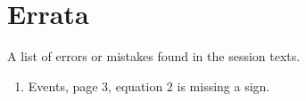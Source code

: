 


\maketitle
\clearpage

\section{Errata}

A list of errors or mistakes found in the session texts.

\begin{enumerate}
\item
Events, page 3, equation 2 is missing a sign.
\end{enumerate}


